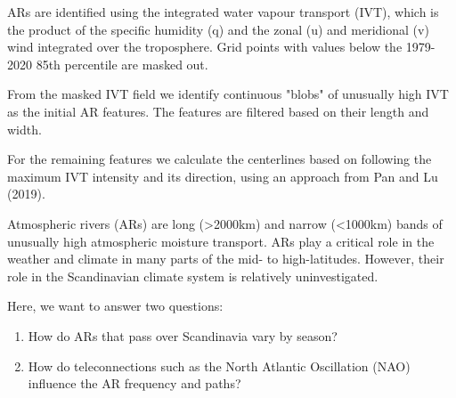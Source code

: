\documentclass{article}
\begin{document}
\begin{minipage}{127.85mm}
	\fontsize{30}{36}\selectfont
	ARs are identified using the integrated water vapour transport (IVT), which is the product of the specific humidity (q) and the zonal (u) and meridional (v) wind integrated over the troposphere. Grid points with values below the 1979-2020 85th percentile are masked out.

	\vspace{30pt}
	From the masked IVT field we identify continuous "blobs" of unusually high IVT as the initial AR features. The features are filtered based on their length and width.

	\vspace{30pt}
	For the remaining features we calculate the centerlines based on following the maximum IVT intensity and its direction, using an approach from Pan and Lu (2019).
\end{minipage}

\begin{minipage}{375.85mm}
	\begin{minipage}[t]{182mm}
		\fontsize{30}{36}\selectfont
		Atmospheric rivers (ARs) are long (>2000km) and narrow (<1000km) bands of unusually high atmospheric moisture transport. ARs play a critical role in the weather and climate in many parts of the mid- to high-latitudes. However, their role in the Scandinavian climate system is relatively uninvestigated.
	\end{minipage}%
	\hfill
	\begin{minipage}[t]{182mm}
		\fontsize{30}{36}\selectfont
		Here, we want to answer two questions:
		\begin{enumerate}
			\item How do ARs that pass over Scandinavia vary by season?

			\item How do teleconnections such as the North Atlantic Oscillation (NAO) influence the AR frequency and paths?
		\end{enumerate}
	\end{minipage}

\end{minipage}

\vspace{30pt}
\end{document}
